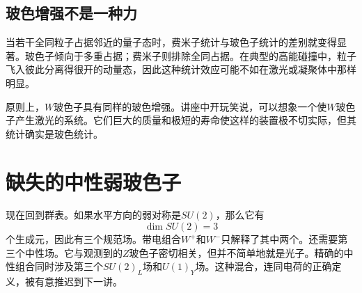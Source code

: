 \begin{classroomqa}
\end{classroomqa}

\subsection{玻色增强不是一种力}

当若干全同粒子占据邻近的量子态时，费米子统计与玻色子统计的差别就变得显著。玻色子倾向于多重占据；费米子则排除全同占据。在典型的高能碰撞中，粒子飞入彼此分离得很开的动量态，因此这种统计效应可能不如在激光或凝聚体中那样明显。

原则上，\(W\)玻色子具有同样的玻色增强。讲座中开玩笑说，可以想象一个使\(W\)玻色子产生激光的系统。它们巨大的质量和极短的寿命使这样的装置极不切实际，但其统计确实是玻色统计。

\begin{classroomqa}
\end{classroomqa}

\begin{classroomqa}
\end{classroomqa}

\section{缺失的中性弱玻色子}

现在回到群表。如果水平方向的弱对称是\(SU(2)\)，那么它有
\begin{equation}
  \dim SU(2)=3
\end{equation}
个生成元，因此有三个规范场。带电组合\(W^+\)和\(W^-\)只解释了其中两个。还需要第三个中性场。它与观测到的\(Z\)玻色子密切相关，但并不简单地就是光子。精确的中性组合同时涉及第三个\(SU(2)_L\)场和\(U(1)_Y\)场。这种混合，连同电荷的正确定义，被有意推迟到下一讲。


